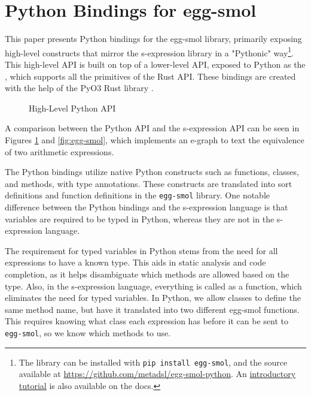 \documentclass[sigplan,screen,review]{acmart}
\begin{document}
\section{Python Bindings for egg-smol}
This paper presents Python bindings for the egg-smol library, primarily exposing high-level constructs that mirror the s-expression library in a "Pythonic" way\footnote{The library can be installed with \verb+pip install egg-smol+, and the source available at \url{https://github.com/metadsl/egg-smol-python}. An \href{https://egg-smol-python.readthedocs.io/en/latest/tutorials/getting-started.html}{introductory tutorial} is also available on the docs.}. This high-level API is built on top of a lower-level API, exposed to Python as the , which supports all the primitives of the Rust API. These bindings are created with the help of the PyO3 Rust library \cite{pyO3}.




 \begin{figure}
   
   \caption{High-Level Python API}
   \label{fig:high-level}
\end{figure}



A comparison between the Python API and the s-expression API can be seen in Figures \ref{fig:high-level} and \ref{fig:egg-smol}, which implements an e-graph to text the equivalence of two arithmetic  expressions.




The Python bindings utilize native Python constructs such as functions, classes, and methods, with type annotations. These constructs are translated into sort definitions and function definitions in the \verb|egg-smol| library. One notable difference between the Python bindings and the s-expression language is that variables are required to be typed in Python, whereas they are not in the s-expression language.

The requirement for typed variables in Python stems from the need for all expressions to have a known type. This aids in static analysis and code completion, as it helps disambiguate which methods are allowed based on the type. Also, in the s-expression language, everything is called as a function, which eliminates the need for typed variables. In Python, we allow classes to define the same method name, but have it translated into two different egg-smol functions. This requires knowing what class each expression has before it can be sent to \verb|egg-smol|, so we know which methods to use.
\end{document}
